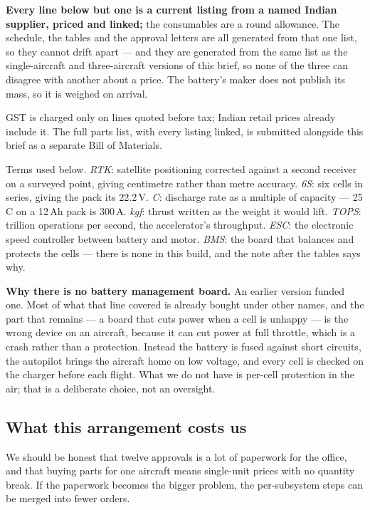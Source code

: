 \documentclass[11pt,a4paper]{article}
\begin{document}
\textbf{Every line below but one is a current listing from a named Indian
supplier, priced and linked;} the consumables are a round allowance. The
schedule, the tables and the approval letters are all generated from that one
list, so they cannot drift apart --- and they are generated from the same list
as the single-aircraft and three-aircraft versions of this brief, so none of the
three can disagree with another about a price. The battery's maker does not
publish its mass, so it is weighed on arrival.

GST is charged only on lines quoted before tax; Indian retail prices already
include it. The full parts list, with every listing linked, is submitted alongside this brief as a separate Bill of Materials.

Terms used below. \emph{RTK}: satellite positioning corrected against
a second receiver on a surveyed point, giving centimetre rather than metre
accuracy. \emph{6S}: six cells in series, giving the pack its 22.2\,V.
\emph{C}: discharge rate as a multiple of capacity --- 25\,C on a 12\,Ah pack
is 300\,A. \emph{kgf}: thrust written as the weight it would lift.
\emph{TOPS}: trillion operations per second, the accelerator's throughput.
\emph{ESC}: the electronic speed controller between battery and motor.
\emph{BMS}: the board that balances and protects the cells --- there is none
in this build, and the note after the tables says why.



\textbf{Why there is no battery management board.} An earlier version funded
one. Most of what that line covered is already bought under other names, and
the part that remains --- a board that cuts power when a cell is unhappy --- is
the wrong device on an aircraft, because it can cut power at full throttle,
which is a crash rather than a protection. Instead the battery is fused against
short circuits, the autopilot brings the aircraft home on low voltage, and
every cell is checked on the charger before each flight. What we do not have is
per-cell protection in the air; that is a deliberate choice, not an oversight.

\subsection{What this arrangement costs us}

We should be honest that twelve approvals is a lot of paperwork for the
office, and that buying parts for one aircraft means single-unit prices with no
quantity break. If the paperwork becomes the bigger problem, the per-subsystem
steps can be merged into fewer orders.
\end{document}
